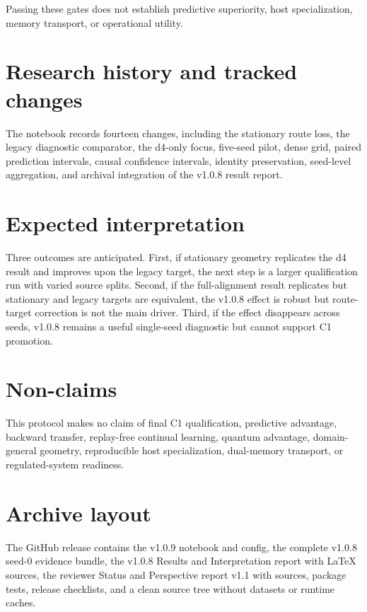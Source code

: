\documentclass[10pt]{article}
\begin{document}
Passing these gates does not establish predictive superiority, host specialization, memory transport, or operational utility.

\section{Research history and tracked changes}
The notebook records fourteen changes, including the stationary route loss, the legacy diagnostic comparator, the d4-only focus, five-seed pilot, dense grid, paired prediction intervals, causal confidence intervals, identity preservation, seed-level aggregation, and archival integration of the v1.0.8 result report.

\section{Expected interpretation}
Three outcomes are anticipated. First, if stationary geometry replicates the d4 result and improves upon the legacy target, the next step is a larger qualification run with varied source splits. Second, if the full-alignment result replicates but stationary and legacy targets are equivalent, the v1.0.8 effect is robust but route-target correction is not the main driver. Third, if the effect disappears across seeds, v1.0.8 remains a useful single-seed diagnostic but cannot support C1 promotion.

\section{Non-claims}
This protocol makes no claim of final C1 qualification, predictive advantage, backward transfer, replay-free continual learning, quantum advantage, domain-general geometry, reproducible host specialization, dual-memory transport, or regulated-system readiness.

\section{Archive layout}
The GitHub release contains the v1.0.9 notebook and config, the complete v1.0.8 seed-0 evidence bundle, the v1.0.8 Results and Interpretation report with LaTeX sources, the reviewer Status and Perspective report v1.1 with sources, package tests, release checklists, and a clean source tree without datasets or runtime caches.
\end{document}
